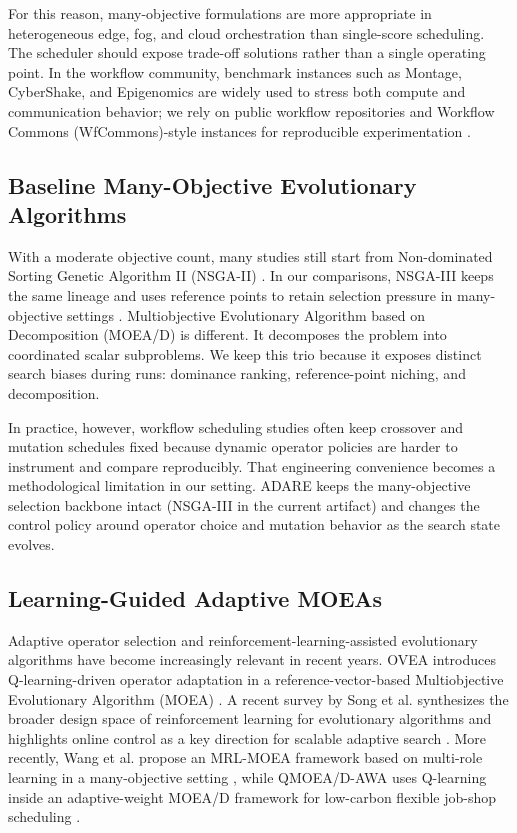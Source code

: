 \documentclass[runningheads]{llncs}
\begin{document}
For this reason, many-objective formulations are more appropriate in heterogeneous edge, fog, and cloud orchestration than single-score scheduling. The scheduler should expose trade-off solutions rather than a single operating point. In the workflow community, benchmark instances such as Montage, CyberShake, and Epigenomics are widely used to stress both compute and communication behavior; we rely on public workflow repositories and Workflow Commons (WfCommons)-style instances for reproducible experimentation \cite{coleman2021wfcommons}.

\subsection{Baseline Many-Objective Evolutionary Algorithms}
With a moderate objective count, many studies still start from Non-dominated Sorting Genetic Algorithm II (NSGA-II) \cite{deb2002nsga2}. In our comparisons, NSGA-III keeps the same lineage and uses reference points to retain selection pressure in many-objective settings \cite{deb2014nsga3}. Multiobjective Evolutionary Algorithm based on Decomposition (MOEA/D) \cite{zhang2007moead} is different. It decomposes the problem into coordinated scalar subproblems. We keep this trio because it exposes distinct search biases during runs: dominance ranking, reference-point niching, and decomposition.

In practice, however, workflow scheduling studies often keep crossover and mutation schedules fixed because dynamic operator policies are harder to instrument and compare reproducibly. That engineering convenience becomes a methodological limitation in our setting. ADARE keeps the many-objective selection backbone intact (NSGA-III in the current artifact) and changes the control policy around operator choice and mutation behavior as the search state evolves.

\subsection{Learning-Guided Adaptive MOEAs}
Adaptive operator selection and reinforcement-learning-assisted evolutionary algorithms have become increasingly relevant in recent years. OVEA introduces Q-learning-driven operator adaptation in a reference-vector-based Multiobjective Evolutionary Algorithm (MOEA) \cite{jiao2023ovea}. A recent survey by Song et al. synthesizes the broader design space of reinforcement learning for evolutionary algorithms and highlights online control as a key direction for scalable adaptive search \cite{song2024survey}. More recently, Wang et al. propose an MRL-MOEA framework based on multi-role learning in a many-objective setting \cite{wang2025mrlmoea}, while QMOEA/D-AWA uses Q-learning inside an adaptive-weight MOEA/D framework for low-carbon flexible job-shop scheduling \cite{wang2026qmoeadawa}.
\end{document}
